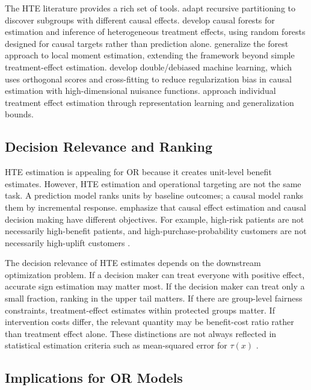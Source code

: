 \documentclass[11pt]{article}
\begin{document}
The HTE literature provides a rich set of tools. \citet{athey2016recursive} adapt recursive partitioning to discover subgroups with different causal effects. \citet{wager2018causalforest} develop causal forests for estimation and inference of heterogeneous treatment effects, using random forests designed for causal targets rather than prediction alone. \citet{athey2019grf} generalize the forest approach to local moment estimation, extending the framework beyond simple treatment-effect estimation. \citet{chernozhukov2018dml} develop double/debiased machine learning, which uses orthogonal scores and cross-fitting to reduce regularization bias in causal estimation with high-dimensional nuisance functions. \citet{shalit2017estimating} approach individual treatment effect estimation through representation learning and generalization bounds.

\subsection{Decision Relevance and Ranking}

HTE estimation is appealing for OR because it creates unit-level benefit estimates. However, HTE estimation and operational targeting are not the same task. A prediction model ranks units by baseline outcomes; a causal model ranks them by incremental response. \citet{fernandez2022causal} emphasize that causal effect estimation and causal decision making have different objectives. For example, high-risk patients are not necessarily high-benefit patients, and high-purchase-probability customers are not necessarily high-uplift customers \citep{fernandez2022causal,leporeni2023causally}.

The decision relevance of HTE estimates depends on the downstream optimization problem. If a decision maker can treat everyone with positive effect, accurate sign estimation may matter most. If the decision maker can treat only a small fraction, ranking in the upper tail matters. If there are group-level fairness constraints, treatment-effect estimates within protected groups matter. If intervention costs differ, the relevant quantity may be benefit-cost ratio rather than treatment effect alone. These distinctions are not always reflected in statistical estimation criteria such as mean-squared error for $\tau(x)$ \citep{kitagawa2018treated,athey2021policy}.

\subsection{Implications for OR Models}
\end{document}

